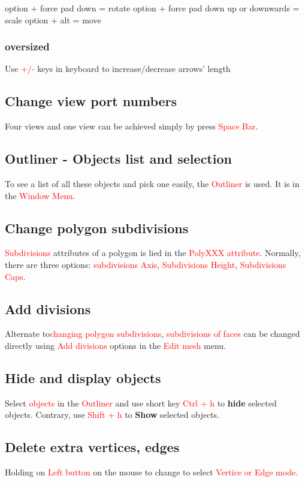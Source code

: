 option + force pad down = rotate
option + force pad down up or downwards = scale
option + alt = move

\subsubsection{oversized}
Use \textcolor{red}{+/-} keys in keyboard to increase/decrease arrows' length 

\subsection{Change view port numbers}
Four views and one view can be achieved simply by press \textcolor{red}{Space Bar}.

\subsection{Outliner - Objects list and selection}
To see a list of all these objects and pick one easily, the \textcolor{red}{Outliner} is used. It is in the \textcolor{red}{Window Menu}.

\subsection{Change polygon subdivisions}
\textcolor{red}{Subdivisions} attributes of a polygon is lied in the \textcolor{red}{PolyXXX attribute}. Normally, there are three options: \textcolor{red}{subdivisions Axis}, \textcolor{red}{Subdivisions Height}, \textcolor{red}{Subdivisions Caps}.

\subsection{Add divisions}
Alternate to\textcolor{red}{changing polygon subdivisions}, \textcolor{red}{subdivisions of faces} can be changed directly using \textcolor{red}{Add divisions} options in the \textcolor{red}{Edit mesh} menu.

\subsection{Hide and display objects}
Select \textcolor{red}{objects} in the \textcolor{red}{Outliner} and use short key \textcolor{red}{Ctrl + h} to \textbf{hide} selected objects. Contrary, use \textcolor{red}{Shift + h} to \textbf{Show} selected objects.

\subsection{Delete extra vertices, edges}
Holding on \textcolor{red}{Left button} on the mouse to change to select \textcolor{red}{Vertice or Edge mode}.\\

